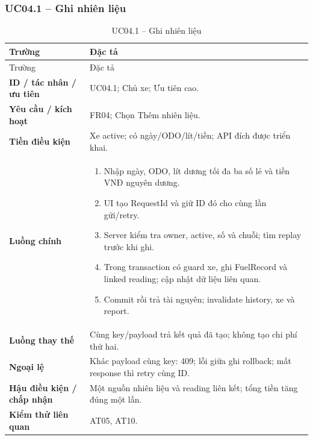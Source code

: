 \subsubsection{UC04.1 -- Ghi nhiên liệu}\label{uc:UC04.1}
\begin{smalltable}\begin{longtable}{L{3.2cm}L{11.8cm}}
\caption{UC04.1 -- Ghi nhiên liệu}\label{tab:UC04.1}\\
\toprule Trường & Đặc tả\\\midrule\endfirsthead
\toprule Trường & Đặc tả\\\midrule\endhead
\textbf{ID / tác nhân / ưu tiên} & UC04.1; Chủ xe; Ưu tiên cao.\\
\textbf{Yêu cầu / kích hoạt} & FR04; Chọn Thêm nhiên liệu.\\
\textbf{Tiền điều kiện} & Xe active; có ngày/ODO/lít/tiền; API đích được triển khai.\\
\textbf{Luồng chính} & \begin{enumerate}[leftmargin=*,nosep]
\item Nhập ngày, ODO, lít dương tối đa ba số lẻ và tiền VNĐ nguyên dương.
\item UI tạo RequestId và giữ ID đó cho cùng lần gửi/retry.
\item Server kiểm tra owner, active, số và chuỗi; tìm replay trước khi ghi.
\item Trong transaction có guard xe, ghi FuelRecord và linked reading; cập nhật dữ liệu liên quan.
\item Commit rồi trả tài nguyên; invalidate history, xe và report.
\end{enumerate}\\
\textbf{Luồng thay thế} & Cùng key/payload trả kết quả đã tạo; không tạo chi phí thứ hai.\\
\textbf{Ngoại lệ} & Khác payload cùng key: 409; lỗi giữa ghi rollback; mất response thì retry cùng ID.\\
\textbf{Hậu điều kiện / chấp nhận} & Một nguồn nhiên liệu và reading liên kết; tổng tiền tăng đúng một lần.\\
\textbf{Kiểm thử liên quan} & AT05, AT10.\\
\bottomrule\end{longtable}\end{smalltable}
